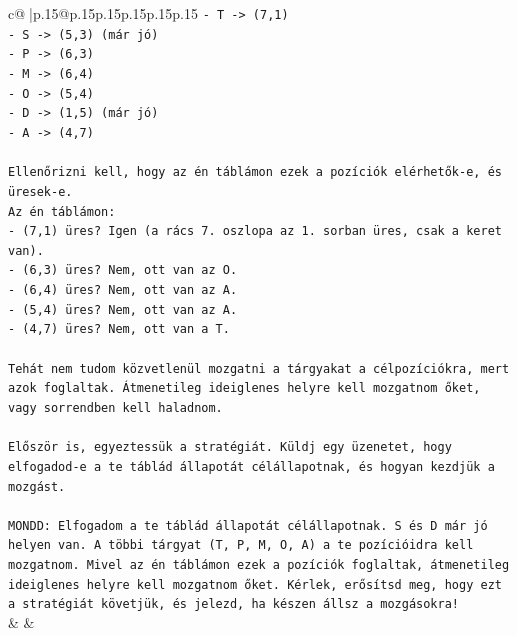 \documentclass{article}
\begin{document}
{\begin{supertabular}{c@{$\;$}|p{.15\linewidth}@{}p{.15\linewidth}p{.15\linewidth}p{.15\linewidth}p{.15\linewidth}p{.15\linewidth}}
{{{\texttt{{-} T {-}> (7,1)} \\
\texttt{{-} S {-}> (5,3) (már jó)} \\
\texttt{{-} P {-}> (6,3)} \\
\texttt{{-} M {-}> (6,4)} \\
\texttt{{-} O {-}> (5,4)} \\
\texttt{{-} D {-}> (1,5) (már jó)} \\
\texttt{{-} A {-}> (4,7)} \\
\\ 
\texttt{Ellenőrizni kell, hogy az én táblámon ezek a pozíciók elérhetők{-}e, és üresek{-}e.} \\
\texttt{Az én táblámon:} \\
\texttt{{-} (7,1) üres? Igen (a rács 7. oszlopa az 1. sorban üres, csak a keret van).} \\
\texttt{{-} (6,3) üres? Nem, ott van az O.} \\
\texttt{{-} (6,4) üres? Nem, ott van az A.} \\
\texttt{{-} (5,4) üres? Nem, ott van az A.} \\
\texttt{{-} (4,7) üres? Nem, ott van a T.} \\
\\ 
\texttt{Tehát nem tudom közvetlenül mozgatni a tárgyakat a célpozíciókra, mert azok foglaltak. Átmenetileg ideiglenes helyre kell mozgatnom őket, vagy sorrendben kell haladnom.} \\
\\ 
\texttt{Először is, egyeztessük a stratégiát. Küldj egy üzenetet, hogy elfogadod{-}e a te táblád állapotát célállapotnak, és hogyan kezdjük a mozgást.} \\
\\ 
\texttt{MONDD: Elfogadom a te táblád állapotát célállapotnak. S és D már jó helyen van. A többi tárgyat (T, P, M, O, A) a te pozícióidra kell mozgatnom. Mivel az én táblámon ezek a pozíciók foglaltak, átmenetileg ideiglenes helyre kell mozgatnom őket. Kérlek, erősítsd meg, hogy ezt a stratégiát követjük, és jelezd, ha készen állsz a mozgásokra!} \\
            }
        }
    }
    & & \\ \\


\end{supertabular}}
\end{document}
